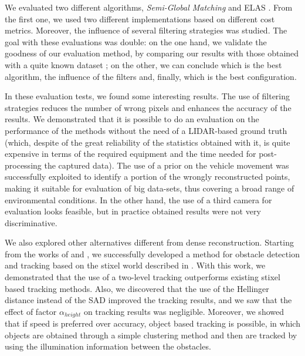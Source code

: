 We evaluated two different algorithms, \emph{Semi-Global Matching} \citep{Hirschmuller2005} and \ac{ELAS} \citep{Geiger2011}. From the first one, we used two different implementations based on different cost metrics. Moreover, the influence of several filtering strategies was studied. The goal with these evaluations was double: on the one hand, we validate the goodness of our evaluation method, by comparing our results with those obtained with a quite known dataset \citep{geiger2013vision}; on the other, we can conclude which is the best algorithm, the influence of the filters and, finally, which is the best configuration.

In these evaluation tests, we found some interesting results. The use of filtering strategies reduces the number of wrong pixels and enhances the accuracy of the results. We demonstrated that it is possible to do an evaluation on the performance of the methods without the need of a \ac{LIDAR}-based ground truth (which, despite of the great reliability of the statistics obtained with it, is quite expensive in terms of the required equipment and the time needed for post-processing the captured data). The use of a prior on the vehicle movement was successfully exploited to identify a portion of the wrongly reconstructed points, making it suitable for evaluation of big data-sets, thus covering a broad range of environmental conditions. In the other hand, the use of a third camera for evaluation looks feasible, but in practice obtained results were not very discriminative.

We also explored other alternatives different from dense reconstruction. Starting from the works of \cite{benenson2011stixels} and \cite{gunyel2012stixels}, we successfully developed a method for obstacle detection and tracking based on the stixel world described in \cite{badino2009stixel}. With this work, we demonstrated that the use of a two-level tracking outperforms existing stixel based tracking methods. Also, we discovered that the use of the Hellinger distance instead of the \acl{SAD} improved the tracking results, and we saw that the effect of factor $\alpha_{height}$ on tracking results was negligible. Moreover, we showed that if speed is preferred over accuracy, object based tracking is possible, in which objects are obtained through a simple clustering method and then are tracked by using the illumination information between the obstacles.

